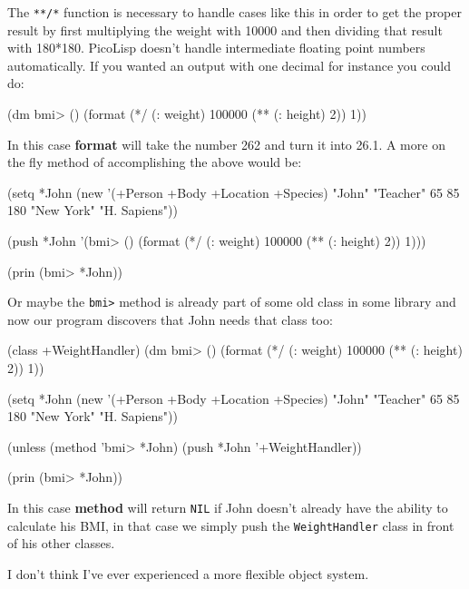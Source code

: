 The \texttt{**/*} function is necessary to handle cases like this in
order to get the proper result by first multiplying the weight with
10000 and then dividing that result with 180*180. PicoLisp doesn't
handle intermediate floating point numbers automatically. If you
wanted an output with one decimal for instance you could do:


\begin{wideverbatim}
(dm bmi> ()
    (format (*/ (: weight) 100000 (** (: height) 2)) 1))
\end{wideverbatim}

In this case \textbf{format} will take the number 262 and turn it into 26.1. A
more on the fly method of accomplishing the above would be:

\begin{wideverbatim}
(setq *John (new '(+Person +Body +Location +Species) 
"John" "Teacher" 65 85 180 "New York" "H. Sapiens"))

(push *John 
      '(bmi> () (format (*/ (: weight) 100000 (** (: height) 2)) 1)))

(prin (bmi> *John))
\end{wideverbatim}

Or maybe the \texttt{bmi>} method is already part of some old class in
some library and now our program discovers that John needs that class
too:

\begin{wideverbatim}
(class +WeightHandler)
(dm bmi> ()
    (format (*/ (: weight) 100000 (** (: height) 2)) 1))

(setq *John (new '(+Person +Body +Location +Species) 
"John" "Teacher" 65 85 180 "New York" "H. Sapiens"))

(unless (method 'bmi> *John) (push *John '+WeightHandler))

(prin (bmi> *John))
\end{wideverbatim}

In this case \textbf{method} will return \texttt{NIL} if John doesn't
already have the ability to calculate his BMI, in that case we simply
push the \texttt{WeightHandler} class in front of his other classes.

I don't think I've ever experienced a more flexible object system.
